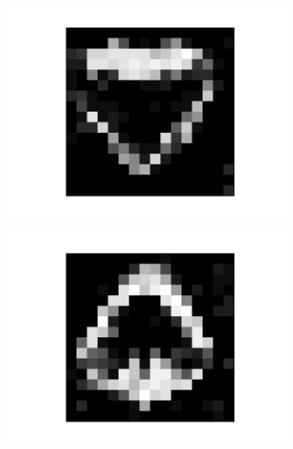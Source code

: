 \begin{figure}[h!]
\begin{subfigure}{.25\textwidth}
  		\centering
  		\includegraphics[width=.6\linewidth]{imgs/poker/recon_img1.png}
  		\label{fig:sub1}
	\end{subfigure}%
	\begin{subfigure}{.25\textwidth}
  		\centering
  		\includegraphics[width=.6\linewidth]{imgs/poker/recon_img7.png}
  		\label{fig:sub1}
	\end{subfigure}%
	

\end{figure}
